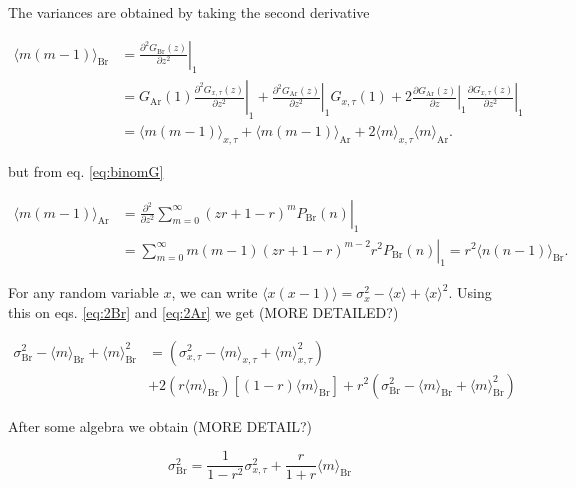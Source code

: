 The variances are obtained by taking the second derivative

\begin{equation}
  \label{eq:2Br}
  \begin{split}
    \langle m(m-1)\rangle_\text{Br} &= \left.\frac{\partial^2 G_\text{Br}(z)}{\partial z^2}\right|_1\\
    &=G_\text{Ar}(1)\left.\frac{\partial^2 G_{x,\tau}(z)}{\partial z^2}\right|_1 + \left.\frac{\partial^2 G_\text{Ar}(z)}{\partial z^2}\right|_1G_{x,\tau}(1) + 2\left.\frac{\partial G_\text{Ar}(z)}{\partial z}\right|_1\left.\frac{\partial G_{x,\tau}(z)}{\partial z^2}\right|_1\\
    &=\langle m(m-1)\rangle_{x,\tau}+\langle m(m-1)\rangle_\text{Ar}+2\langle m\rangle_{x,\tau}\langle m\rangle_\text{Ar}.
  \end{split}
\end{equation}

but from eq. \ref{eq:binomG}

\begin{equation}
  \label{eq:2Ar}
  \begin{split}
    \langle m(m-1)\rangle_\text{Ar} &= \left.\frac{\partial^2}{\partial z^2}\sum_{m=0}^\infty(zr+1-r)^mP_\text{Br}(n)\right|_1\\
    &= \left.\sum_{m=0}^\infty m(m-1)(zr+1-r)^{m-2}r^2P_\text{Br}(n)\right|_1 = r^2\langle n(n-1)\rangle_\text{Br}.
  \end{split}
\end{equation}

For any random variable $x$, we can write $\langle x(x-1)\rangle = \sigma_x^2 - \langle x\rangle + \langle x\rangle^2$. Using this on eqs. \ref{eq:2Br} and \ref{eq:2Ar} we get (MORE DETAILED?)

\begin{equation*}
  \begin{split}
  \sigma^2_\text{Br}- \langle m\rangle_\text{Br} + \langle m\rangle^2_\text{Br} &= \left( \sigma^2_{x,\tau} - \langle m\rangle_{x,\tau} + \langle m\rangle_{x,\tau}^2\right)\\
&+ 2\left(r\langle m\rangle_\text{Br}\right)\left[(1-r)\langle m\rangle_\text{Br}\right]+r^2\left(\sigma^2_\text{Br}- \langle m\rangle_\text{Br} + \langle m\rangle^2_\text{Br}\right)
  \end{split}
\end{equation*}

After some algebra we obtain (MORE DETAIL?)

\begin{equation}
  \label{eq:sigmaBr}
  \sigma^2_\text{Br} = \frac{1}{1-r^2}\sigma^2_{x,\tau}+\frac{r}{1+r}\langle m\rangle_\text{Br}
\end{equation}

